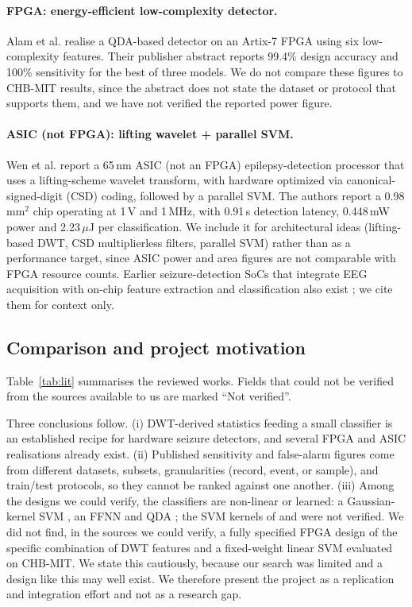 \documentclass[10pt,twocolumn,letterpaper]{article}
\begin{document}
\paragraph{FPGA: energy-efficient low-complexity detector.} Alam et al.
\cite{alam2024qda} realise a QDA-based detector on an Artix-7 FPGA using
six low-complexity features. Their publisher abstract reports 99.4\%
design accuracy and 100\% sensitivity for the best of three models. We
do not compare these figures to CHB-MIT results, since the abstract does
not state the dataset or protocol that supports them, and we have not
verified the reported power figure.

\paragraph{ASIC (not FPGA): lifting wavelet + parallel SVM.} Wen et al.
\cite{wen2022asic} report a 65\,nm ASIC (not an FPGA) epilepsy-detection
processor that uses a lifting-scheme wavelet transform, with hardware
optimized via canonical-signed-digit (CSD) coding, followed by a
parallel SVM. The authors report a 0.98\,mm$^2$ chip operating at 1\,V
and 1\,MHz, with 0.91\,s detection latency, 0.448\,mW power and
2.23\,$\mu$J per classification. We include it for architectural ideas
(lifting-based DWT, CSD multiplierless filters, parallel SVM) rather
than as a performance target, since ASIC power and area figures are not
comparable with FPGA resource counts. Earlier seizure-detection SoCs
that integrate EEG acquisition with on-chip feature extraction and
classification also exist \cite{verma2010micro,yoo2013eight}; we cite
them for context only.

\subsection{Comparison and project motivation}

Table~\ref{tab:lit} summarises the reviewed works. Fields that could not
be verified from the sources available to us are marked ``Not
verified''.

Three conclusions follow. (i) DWT-derived statistics feeding a small
classifier is an established recipe for hardware seizure detectors, and
several FPGA and ASIC realisations already exist. (ii) Published
sensitivity and false-alarm figures come from different datasets,
subsets, granularities (record, event, or sample), and train/test
protocols, so they cannot be ranked against one another. (iii) Among the
designs we could verify, the classifiers are non-linear or learned: a
Gaussian-kernel SVM \cite{feng2018vlsi}, an FFNN
\cite{shanmugam2025ffnn} and QDA \cite{alam2024qda}; the SVM kernels of
\cite{wang2017integrating} and \cite{wen2022asic} were not verified. We
did not find, in the sources we could verify, a fully specified FPGA
design of the specific combination of DWT features and a fixed-weight
linear SVM evaluated on CHB-MIT. We state this cautiously, because our
search was limited and a design like this may well exist. We therefore
present the project as a replication and integration effort and not as a
research gap.
\end{document}
